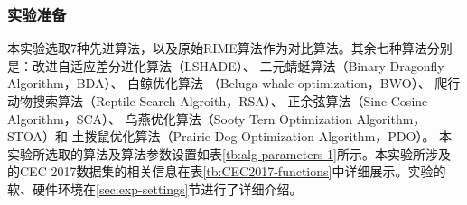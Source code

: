 \documentclass{wzuthesis}
\begin{document}
\subsubsection{实验准备}
本实验选取7种先进算法，以及原始RIME算法作为对比算法。其余七种算法分别是：改进自适应差分进化算法（LSHADE）、
二元蜻蜓算法（Binary Dragonfly Algorithm，BDA）、
白鲸优化算法 （Beluga whale optimization，BWO）、
爬行动物搜索算法（Reptile Search Algroith，RSA）、
正余弦算法（Sine Cosine Algorithm，SCA）、
乌燕优化算法（Sooty Tern Optimization Algorithm，STOA）和
土拨鼠优化算法（Prairie Dog Optimization Algorithm，PDO）。
本实验所选取的算法及算法参数设置如表\ref{tb:alg-parameters-1}所示。本实验所涉及的CEC 2017数据集的相关信息在表\ref{tb:CEC2017-functions}中详细展示。实验的软、硬件环境在\ref{sec:exp-settings}节进行了详细介绍。
\end{document}
